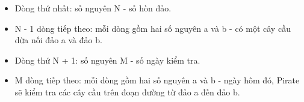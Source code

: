 \begin{itemize}
	\item     Dòng thứ nhất: số nguyên N - số hòn đảo.   
	\item     N - 1 dòng tiếp theo: mỗi dòng gồm hai số nguyên a và b - có một cây cầu dừa nối đảo a và đảo b.   
	\item     Dòng thứ N + 1: số nguyên M - số ngày kiểm tra.   
	\item     M dòng tiếp theo: mỗi dòng gồm hai số nguyên a và b - ngày hôm đó, Pirate sẽ kiểm tra các cây cầu trên đoạn đường từ đảo a đến đảo b.   
\end{itemize}